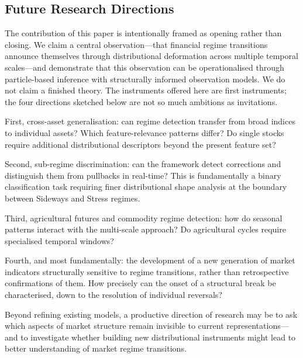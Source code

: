 \documentclass[11pt]{article}
\begin{document}
\subsection{Future Research Directions}

The contribution of this paper is intentionally framed as opening rather
than closing. We claim a central observation---that financial regime
transitions announce themselves through distributional deformation
across multiple temporal scales---and demonstrate that this observation
can be operationalised through particle-based inference with structurally
informed observation models. We do not claim a finished theory. The
instruments offered here are first instruments; the four directions
sketched below are not so much ambitions as invitations.

First, cross-asset generalisation: can regime detection transfer from
broad indices to individual assets? Which feature-relevance patterns
differ? Do single stocks require additional distributional descriptors
beyond the present feature set?

Second, sub-regime discrimination: can the framework detect corrections
and distinguish them from pullbacks in real-time? This is fundamentally
a binary classification task requiring finer distributional shape
analysis at the boundary between Sideways and Stress regimes.

Third, agricultural futures and commodity regime detection: how do
seasonal patterns interact with the multi-scale approach? Do
agricultural cycles require specialised temporal windows?

Fourth, and most fundamentally: the development of a new generation of
market indicators structurally sensitive to regime transitions, rather
than retrospective confirmations of them. How precisely can the onset of
a structural break be characterised, down to the resolution of
individual reversals?

Beyond refining existing models, a productive direction of research may
be to ask which aspects of market structure remain invisible to current
representations---and to investigate whether building new distributional
instruments might lead to better understanding of market regime
transitions.


\end{document}
